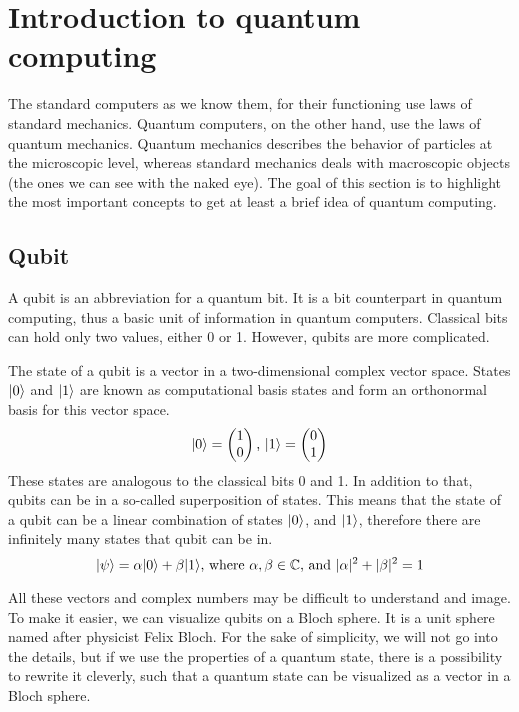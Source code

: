 \section{Introduction to quantum computing}
The standard computers as we know them, for their functioning use laws of standard mechanics. Quantum computers, on the other hand, use the laws of quantum mechanics. Quantum mechanics describes the behavior of particles at the microscopic level, whereas standard mechanics deals with macroscopic objects (the ones we can see with the naked eye). The goal of this section is to highlight the most important concepts to get at least a brief idea of quantum computing.
\subsection{Qubit}
A qubit is an abbreviation for a quantum bit. It is a bit counterpart in quantum computing, thus a basic unit of information in quantum computers. Classical bits can hold only two values, either 0 or 1. However, qubits are more complicated.

The state of a qubit is a vector in a two-dimensional complex vector space. States $\lvert0\rangle$ and $\lvert1\rangle$ are known as computational basis states and form an orthonormal basis for this vector space. \cite{qc} 
$$\lvert0\rangle = \begin{pmatrix} 1 \\ 0 \end{pmatrix}\text{, }\lvert1\rangle = \begin{pmatrix} 0 \\ 1 \end{pmatrix}$$
These states are analogous to the classical bits 0 and 1. In addition to that, qubits can be in a so-called superposition of states. This means that the state of a qubit can be a linear combination of states $\lvert0\rangle$, and $\lvert1\rangle$, therefore there are infinitely many states that qubit can be in. $$\lvert\psi\rangle = \alpha \lvert0\rangle + 
\beta \lvert1\rangle\text{, where } \alpha,\beta \in \mathbb{C}\text{, and } \lvert \alpha \rvert^2 + \lvert \beta \rvert^2 = 1$$

All these vectors and complex numbers may be difficult to understand and image. To make it easier, we can visualize qubits on a Bloch sphere. It is a unit sphere named after physicist Felix Bloch. For the sake of simplicity, we will not go into the details, but if we use the properties of a quantum state, there is a possibility to rewrite it cleverly, such that a quantum state can be visualized as a vector in a Bloch sphere.

